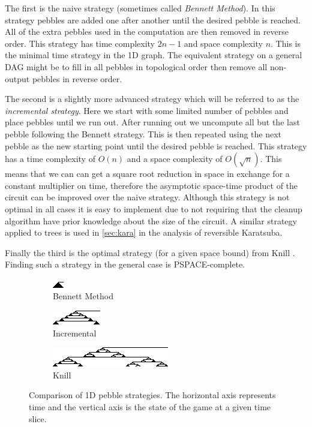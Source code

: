 The first is the naive strategy (sometimes called \emph{Bennett Method}). In
this strategy pebbles are added one after another until the desired pebble is
reached.  All of the extra pebbles used in the computation are then removed in
reverse order. This strategy has time complexity $2n-1$ and space complexity
$n$. This is the minimal time strategy in the 1D graph. The equivalent strategy
on a general DAG might be to fill in all pebbles in topological order then
remove all non-output pebbles in reverse order.

The second is a slightly more advanced strategy which will be referred to as
the \emph{incremental strategy}. Here we start with some limited number of
pebbles and place pebbles until we run out. After running out we uncompute all
but the last pebble following the Bennett strategy. This is then repeated using
the next pebble as the new starting point until the desired pebble is reached.
This strategy has a time complexity of $O(n)$ and a space complexity of
$O(\sqrt n)$. This means that we can can get a square root reduction in space
in exchange for a constant multiplier on time, therefore the asymptotic
space-time product of the circuit can be improved over the naive strategy.
Although this strategy is not optimal in all cases it is easy to implement due
to not requiring that the cleanup algorithm have prior knowledge about the size
of the circuit. A similar strategy applied to trees is used in \cref{sec:kara}
in the analysis of reversible Karatsuba.

Finally the third is the optimal strategy (for a given space bound) from Knill
\cite{knill:95}. Finding such a strategy in the general case is
PSPACE-complete.  



\begin{figure}
  \centering
  \begin{subfigure}{0.3\textwidth}
    \centering
    \includegraphics{images/Pebble1.png}
    \caption{Bennett Method}
  \end{subfigure}
  \begin{subfigure}{0.3\textwidth}
    \centering
    \includegraphics{images/Pebble2.png}
    \caption{Incremental}
  \end{subfigure}\begin{subfigure}{0.3\textwidth}
    \centering
    \includegraphics{images/Pebble3.png}
    \caption{Knill}
  \end{subfigure}
  \label{fig:pebble}
  \caption{Comparison of 1D pebble strategies. The horizontal axis represents
  time and the vertical axis is the state of the game at a given time slice.}
\end{figure}

